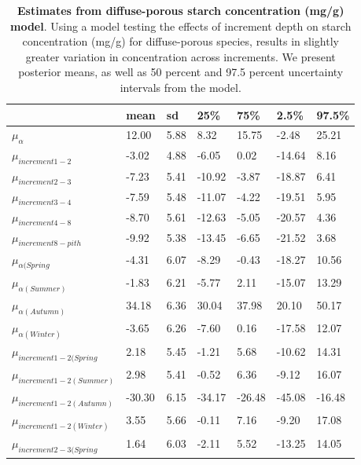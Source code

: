 \documentclass{article}\usepackage[]{graphicx}\usepackage[]{color}
\begin{document}
\begin{table}[ht]
\centering
\caption{\textbf{Estimates from diffuse-porous starch concentration (mg/g) model}. Using a model testing the effects of increment depth on starch concentration (mg/g) for diffuse-porous species, results in slightly greater variation in concentration across increments. We present posterior means, as well as 50 percent and 97.5 percent uncertainty intervals from the model.} 
\label{tab:diffstar}
\begingroup\footnotesize
\begin{tabular}{|p{}|p{}|p{}|p{}|p{}|p{}|p{}|}
  \hline
 & mean & sd & 25\% & 75\% & 2.5\% & 97.5\% \\ 
  \hline
$\mu_{\alpha}$ & 12.00 & 5.88 & 8.32 & 15.75 & -2.48 & 25.21 \\ 
  $\mu_{increment 1-2}$ & -3.02 & 4.88 & -6.05 & 0.02 & -14.64 & 8.16 \\ 
  $\mu_{increment 2-3}$ & -7.23 & 5.41 & -10.92 & -3.87 & -18.87 & 6.41 \\ 
  $\mu_{increment 3-4}$ & -7.59 & 5.48 & -11.07 & -4.22 & -19.51 & 5.95 \\ 
  $\mu_{increment 4-8}$ & -8.70 & 5.61 & -12.63 & -5.05 & -20.57 & 4.36 \\ 
  $\mu_{increment 8-pith}$ & -9.92 & 5.38 & -13.45 & -6.65 & -21.52 & 3.68 \\ 
  $\mu_{\alpha (Spring}$ & -4.31 & 6.07 & -8.29 & -0.43 & -18.27 & 10.56 \\ 
  $\mu_{\alpha (Summer)}$ & -1.83 & 6.21 & -5.77 & 2.11 & -15.07 & 13.29 \\ 
  $\mu_{\alpha (Autumn)}$ & 34.18 & 6.36 & 30.04 & 37.98 & 20.10 & 50.17 \\ 
  $\mu_{\alpha (Winter)}$ & -3.65 & 6.26 & -7.60 & 0.16 & -17.58 & 12.07 \\ 
  $\mu_{increment 1-2 (Spring}$ & 2.18 & 5.45 & -1.21 & 5.68 & -10.62 & 14.31 \\ 
  $\mu_{increment 1-2 (Summer)}$ & 2.98 & 5.41 & -0.52 & 6.36 & -9.12 & 16.07 \\ 
  $\mu_{increment 1-2 (Autumn)}$ & -30.30 & 6.15 & -34.17 & -26.48 & -45.08 & -16.48 \\ 
  $\mu_{increment 1-2 (Winter)}$ & 3.55 & 5.66 & -0.11 & 7.16 & -9.20 & 17.08 \\ 
  $\mu_{increment 2-3 (Spring}$ & 1.64 & 6.03 & -2.11 & 5.52 & -13.25 & 14.05 \\ 

\end{tabular}
\end{table}
\end{document}
